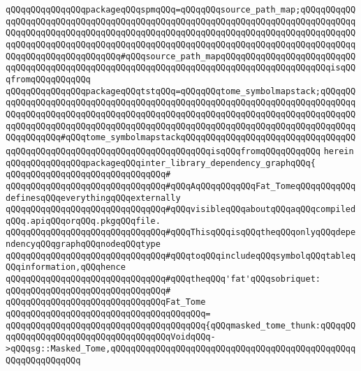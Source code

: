 \verb|qQQqqQQqqQQqqQQqpackageqQQqspmqQQq=qQQqqQQqsource_path_map;qQQqqQQqqQQqqQQqqQQqqQQqqQQqqQQqqQQqqQQqqQQqqQQqqQQqqQQqqQQqqQQqqQQqqQQqqQQqqQQqqQQqqQQqqQQqqQQqqQQqqQQqqQQqqQQqqQQqqQQqqQQqqQQqqQQqqQQqqQQqqQQqqQQqqQQqqQQqqQQqqQQqqQQqqQQqqQQqqQQqqQQqqQQqqQQqqQQqqQQqqQQqqQQqqQQqqQQqqQQqqQQqqQQqqQQqqQQqqQQqqQQq#qQQqsource_path_mapqQQqqQQqqQQqqQQqqQQqqQQqqQQqqQQqqQQqqQQqqQQqqQQqqQQqqQQqqQQqqQQqqQQqqQQqqQQqqQQqqQQqqQQqqQQqisqQQqfromqQQqqQQqqQQq|\newline
\verb|qQQqqQQqqQQqqQQqpackageqQQqtstqQQq=qQQqqQQqtome_symbolmapstack;qQQqqQQqqQQqqQQqqQQqqQQqqQQqqQQqqQQqqQQqqQQqqQQqqQQqqQQqqQQqqQQqqQQqqQQqqQQqqQQqqQQqqQQqqQQqqQQqqQQqqQQqqQQqqQQqqQQqqQQqqQQqqQQqqQQqqQQqqQQqqQQqqQQqqQQqqQQqqQQqqQQqqQQqqQQqqQQqqQQqqQQqqQQqqQQqqQQqqQQqqQQqqQQqqQQqqQQqqQQqqQQqqQQq#qQQqtome_symbolmapstackqQQqqQQqqQQqqQQqqQQqqQQqqQQqqQQqqQQqqQQqqQQqqQQqqQQqqQQqqQQqqQQqqQQqqQQqqQQqisqQQqfromqQQqqQQqqQQq|\newline
\verb|herein|\newline
\newline
\verb|qQQqqQQqqQQqqQQqpackageqQQqinter_library_dependency_graphqQQq{|\newline
\verb|qQQqqQQqqQQqqQQqqQQqqQQqqQQqqQQq#|\newline
\verb|qQQqqQQqqQQqqQQqqQQqqQQqqQQqqQQq#qQQqAqQQqqQQqqQQqFat_TomeqQQqqQQqqQQqdefinesqQQqeverythingqQQqexternally|\newline
\verb|qQQqqQQqqQQqqQQqqQQqqQQqqQQqqQQq#qQQqvisibleqQQqaboutqQQqaqQQqcompiledqQQq.apiqQQqorqQQq.pkgqQQqfile.|\newline
\verb|qQQqqQQqqQQqqQQqqQQqqQQqqQQqqQQq#qQQqThisqQQqisqQQqtheqQQqonlyqQQqdependencyqQQqgraphqQQqnodeqQQqtype|\newline
\verb|qQQqqQQqqQQqqQQqqQQqqQQqqQQqqQQq#qQQqtoqQQqincludeqQQqsymbolqQQqtableqQQqinformation,qQQqhence|\newline
\verb|qQQqqQQqqQQqqQQqqQQqqQQqqQQqqQQq#qQQqtheqQQq'fat'qQQqsobriquet:|\newline
\verb|qQQqqQQqqQQqqQQqqQQqqQQqqQQqqQQq#|\newline
\verb|qQQqqQQqqQQqqQQqqQQqqQQqqQQqqQQqFat_Tome|\newline
\verb|qQQqqQQqqQQqqQQqqQQqqQQqqQQqqQQqqQQqqQQq=|\newline
\verb|qQQqqQQqqQQqqQQqqQQqqQQqqQQqqQQqqQQqqQQq{qQQqmasked_tome_thunk:qQQqqQQqqQQqqQQqqQQqqQQqqQQqqQQqqQQqqQQqVoidqQQq->qQQqsg::Masked_Tome,qQQqqQQqqQQqqQQqqQQqqQQqqQQqqQQqqQQqqQQqqQQqqQQqqQQqqQQqqQQqqQQq|\newline
